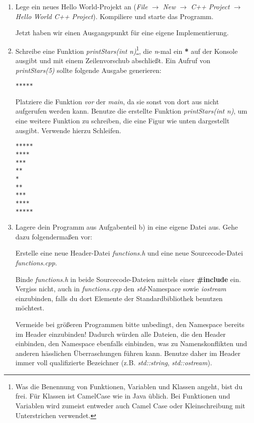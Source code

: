 \begin{enumerate}

\item Lege ein neues \glqq{}Hello World\grqq{}-Projekt an (\emph{File} $\rightarrow$ \emph{New} $\rightarrow$ \emph{C++ Project} $\rightarrow$ \emph{Hello World C++ Project}).
Kompiliere und starte das Programm.

Jetzt haben wir einen Ausgangspunkt für eine eigene Implementierung.


\item 
Schreibe eine Funktion \emph{printStars(int n)}\footnote{Was die Benennung von Funktionen, Variablen und Klassen angeht, bist du frei.
Für Klassen ist CamelCase wie in Java üblich. Bei Funktionen und Variablen wird zumeist entweder auch Camel Case oder Kleinschreibung mit Unterstrichen verwendet.}, die \emph{n}-mal ein \textbf{*} auf der Konsole ausgibt und mit einem Zeilenvorschub abschließt.
Ein Aufruf von \emph{printStars(5)} sollte folgende Ausgabe generieren:
\begin{lstlisting}
*****
\end{lstlisting}

Platziere die Funktion \emph{vor} der \emph{main}, da sie sonst von dort aus nicht aufgerufen werden kann.
Benutze die erstellte Funktion \emph{printStars(int n)}, um eine weitere Funktion zu schreiben, die eine Figur wie unten dargestellt ausgibt.
Verwende hierzu Schleifen.
\begin{lstlisting}
*****
****
***
**
*
**
***
****
*****
\end{lstlisting}

\item
Lagere dein Programm aus Aufgabenteil b) in eine eigene Datei aus.
Gehe dazu folgendermaßen vor: 

Erstelle eine neue Header-Datei \emph{functions.h} und eine neue Sourcecode-Datei \emph{functions.cpp}. 

Binde \emph{functions.h} in beide Sourcecode-Dateien mittels 
einer \textbf{\#include} ein.
Vergiss nicht, auch in \emph{functions.cpp} den \emph{std}-Namespace sowie \emph{iostream} einzubinden, falls du dort Elemente der Standardbibliothek benutzen möchtest.

Vermeide bei größeren Programmen bitte unbedingt, den Namespace bereits im Header einzubinden!
Dadurch würden alle Dateien, die den Header einbinden, den Namespace ebenfalls einbinden, was zu Namenskonflikten und anderen hässlichen Überraschungen führen kann.
Benutze daher im Header immer voll qualifizierte Bezeichner (z.B. \emph{std::string}, \emph{std::ostream}).


\end{enumerate}
